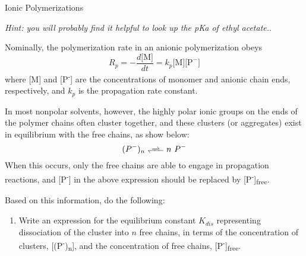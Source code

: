 \begin{activity}{Ionic Polymerizations}
\begin{exercises}
\begin{enumerate}
				\emph{Hint: you will probably find it helpful to look up the pKa of ethyl acetate.}.
			
				\begin{solution}\end{solution}
				
		\end{enumerate}

	\exercise Nominally, the polymerization rate in an anionic polymerization obeys
		\begin{equation*}
			R_p = -\frac{d\text{[M]}}{dt} = k_p\text{[M][P}^-\text{]}
		\end{equation*}
		where [M] and [P\textsuperscript{-}] are the concentrations of monomer and anionic chain ends, respectively, and $k_p$ is the propagation rate constant.
		
		In most nonpolar solvents, however, the highly polar ionic groups on the ends of the polymer chains often cluster together, and these clusters (or aggregates) exist in equilibrium with the free chains, as show below:
			\begin{equation*}
				(P^-)_n \ce{<<=>} n\,\,P^-
			\end{equation*}
		When this occurs, only the free chains are able to engage in propagation reactions, and [P\textsuperscript{-}] in the above expression should be replaced by [P\textsuperscript{-}]\textsubscript{free}.
		
		Based on this information, do the following:
		\begin{enumerate}
			\item Write an expression for the equilibrium constant $K_{dis}$ representing dissociation of the cluster into $n$ free chains, in terms of the concentration of clusters, [(P\textsuperscript{-})\textsubscript{n}], and the concentration of free chains, [P\textsuperscript{-}]\textsubscript{free}.
				
				\begin{solution}\end{solution}
				

\end{enumerate}
\end{exercises}
\end{activity}
